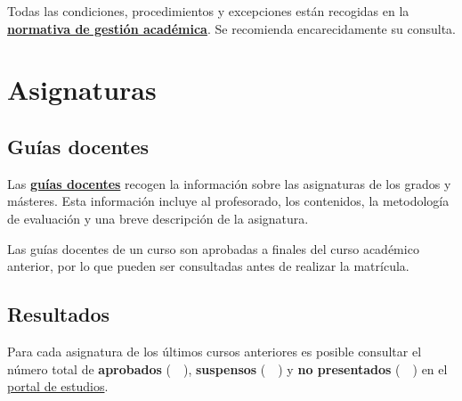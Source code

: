 \begin{importantBox}
    Todas las condiciones, procedimientos y excepciones están recogidas en la \href{https://www.udc.es/gl/normativa/academica/}{\textbf{normativa de gestión académica}}. Se recomienda encarecidamente su consulta.
\end{importantBox}


\section{Asignaturas}

\subsection{Guías docentes}

Las \href{https://guiadocente.udc.es/guia_docent/index.php?centre=614&ensenyament=614G01&consulta=assignatures&idioma=cast}{\textbf{guías docentes}} recogen la información sobre las asignaturas de los grados y másteres. Esta información incluye al profesorado, los contenidos, la metodología de evaluación y una breve descripción de la asignatura.  

\begin{curiosityBox}
    Las guías docentes de un curso son aprobadas a finales del curso académico anterior, por lo que pueden ser consultadas antes de realizar la matrícula.
\end{curiosityBox}

\subsection{Resultados}

Para cada asignatura de los últimos cursos anteriores es posible consultar el número total de \textbf{aprobados} (~\textcolor{resultPassed}{}~), \textbf{suspensos} (~\textcolor{resultFailed}{}~) y \textbf{no presentados} (~\textcolor{resultNotPresented}{}~) en el \href{\linkPortalEstudos}{portal de estudios}.

\FloatBarrier
\begin{figure}[htp]
    \centering
\end{figure}
\FloatBarrier

